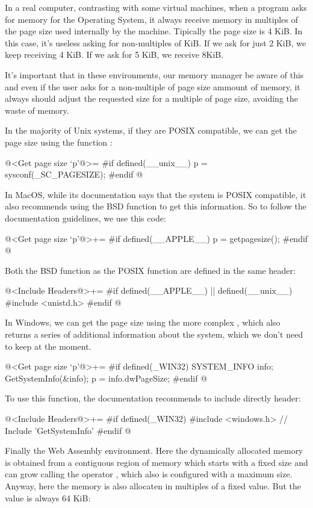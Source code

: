 In a real computer, contrasting with some virtual machines, when a
program asks for memory for the Operating System, it always receive
memory in multiples of the page size used internally by the
machine. Tipically the page size is 4 KiB. In this case, it's useless
asking for non-multiples of KiB. If we ask for just 2 KiB, we keep
receiving 4 KiB. If we ask for 5 KiB, we receive 8KiB.

It's important that in these environments, our memory manager be aware
of this and even if the user asks for a non-multiple of page size
ammount of memory, it always should adjust the requested size for a
multiple of page size, avoiding the waste of memory.

In the majority of Unix systems, if they are POSIX compatible, we can
get the page size using the function :

\iniciocodigo
@<Get page size `p'@>=
#if defined(__unix__)
p = sysconf(_SC_PAGESIZE);
#endif
@
\fimcodigo

In MacOS, while its documentation says that the system is POSIX
compatible, it also recommends using the BSD
function  to get this information. So to
follow the documentation guidelines, we use this code:

\iniciocodigo
@<Get page size `p'@>+=
#if defined(__APPLE__)
p = getpagesize();
#endif
@
\fimcodigo

Both the BSD function as the POSIX function are defined in the same header:

\iniciocodigo
@<Include Headers@>+=
#if defined(__APPLE__) || defined(__unix__)
#include <unistd.h>
#endif
@
\fimcodigo

In Windows, we can get the page size using the more
complex , which also returns a series of
additional information about the system, which we don't need to keep
at the moment.

\iniciocodigo
@<Get page size `p'@>+=
#if defined(_WIN32)
{
  SYSTEM_INFO info;
  GetSystemInfo(&info);
  p = info.dwPageSize;
}
#endif
@
\fimcodigo

To use this function, the documentation recommends to include
directly  header:

\iniciocodigo
@<Include Headers@>+=
#if defined(_WIN32)
#include <windows.h> // Include 'GetSystemInfo'
#endif
@
\fimcodigo

Finally the Web Assembly environment. Here the dynamically allocated
memory is obtained from a contiguous region of memory which starts
with a fixed size and can grow calling the
operator , which also is configured with a
maximum size. Anyway, here the memory is also allocaten in multiples
of a fixed value. But the value is always 64 KiB:

